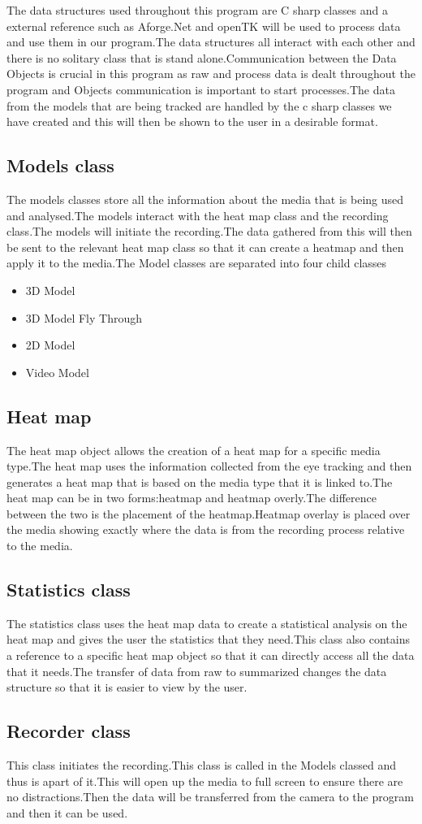 The data structures used throughout this program are C sharp classes and a external reference such as Aforge.Net and openTK will be used to process data and use them in our program.The data structures all interact with each other and there is no solitary class that is stand alone.Communication between the Data Objects is crucial in this program as raw and process data is dealt throughout the program and Objects communication is important to start processes.The data from the models that are being tracked are handled by the c sharp classes we have created and this will then be shown to the user in a desirable format.

\subsection{Models class}
The models classes store all the information about the media that is being used and analysed.The models interact with the heat map class and the recording class.The models will initiate the recording.The data gathered from this will then be sent to the relevant heat map class so that it can create a heatmap and then apply it to the media.The Model classes are separated into four child classes
\begin{itemize}
\item 3D Model
\item 3D Model Fly Through
\item 2D Model
\item Video Model
\end{itemize}
\subsection{Heat map}
The heat map object allows the creation of a heat map for a specific media type.The heat map uses the information collected from the eye tracking and then generates a heat map that is based on the media type that it is linked to.The heat map can be in two forms:heatmap and heatmap overly.The difference between the two is the placement of the heatmap.Heatmap overlay is placed over the media showing exactly where the data is from the recording process relative to the media.
\subsection{Statistics class}
The statistics class uses the heat map data to create a statistical analysis on the heat map and gives the user the statistics that they need.This class also contains a reference to a specific heat map object so that it can directly access all the data that it needs.The transfer of data from raw to summarized changes the data structure so that it is easier to view by the user.
\subsection{Recorder class}
This class initiates the recording.This class is called in the Models classed and thus is apart of it.This will open up the media to full screen to ensure there are no distractions.Then the data will be transferred from the camera to the program and then it can be used.